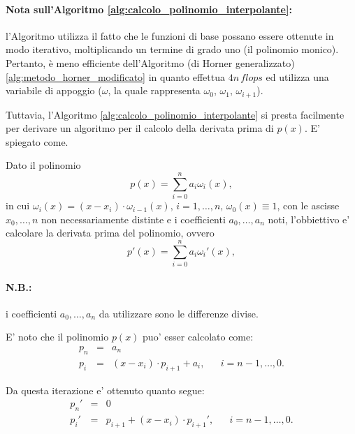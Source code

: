 \paragraph{Nota sull'Algoritmo \ref{alg:calcolo_polinomio_interpolante}:} l'Algoritmo utilizza il fatto che le funzioni di base possano essere ottenute in modo iterativo, moltiplicando un termine di grado uno (il \gls{polinomio monico}). Pertanto, è meno efficiente dell'Algoritmo (di Horner generalizzato) \ref{alg:metodo_horner_modificato} in quanto effettua $4n\, flops$ ed utilizza una variabile di appoggio ($\omega$, la quale rappresenta $\omega_0,\,\omega_1,\,\omega_{i+1}$).

\noindent Tuttavia, l'Algoritmo \ref{alg:calcolo_polinomio_interpolante} si presta facilmente per derivare un algoritmo per il calcolo della derivata prima di $p(x)$. E' spiegato come.

Dato il polinomio
\begin{equation*}
	p(x) = \sum_{i=0}^{n} a_i \omega_i(x),
\end{equation*}
in cui $\omega_i(x) = (x-x_i)\cdot \omega_{i-1}(x),\, i = 1, \hdots, n,\, \omega_0(x) \equiv 1 $, con le ascisse $x_0,\hdots, n$ non necessariamente distinte e i coefficienti $a_0,\hdots, a_n$ noti, l'obbiettivo e' calcolare la derivata prima del polinomio, ovvero
\begin{equation*}
	p'(x) = \sum_{i=0}^{n} a_i \omega_i'(x),
\end{equation*}

\paragraph{N.B.:} i coefficienti $a_0,\hdots, a_n$ da utilizzare sono le differenze divise.

\noindent E' noto che il polinomio $p(x)$ puo' esser calcolato come:
\begin{equation}\label{eq:iterazione_calcolo_derivata}
	\begin{matrix}
		p_n &=& a_n\\
		p_i &=& (x-x_i)\cdot p_{i+1} + a_i, && i = n-1, \hdots, 0.
	\end{matrix}
\end{equation}

\noindent Da questa iterazione e' ottenuto quanto segue:
\begin{equation}\label{eq:iterazione_calcolo_derivata1}
	\begin{matrix}
		p_n' &=& 0\\
		p_i' &=& p_{i+1} + (x-x_i) \cdot p_{i+1}', && i = n-1, \hdots, 0.
	\end{matrix}
\end{equation}

